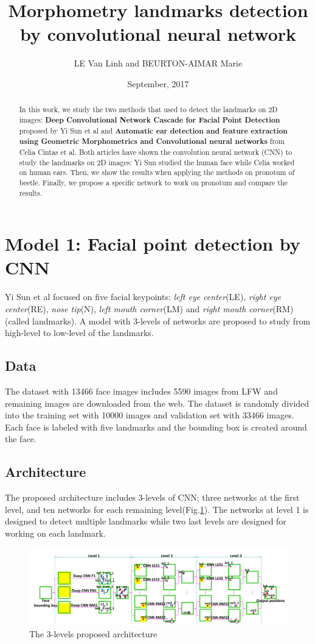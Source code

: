 \documentclass[12pt,a4paper]{article}
\begin{document}
\title{Morphometry landmarks detection by convolutional neural network}
\author{LE Van Linh and BEURTON-AIMAR Marie}
\date{September, 2017}
\maketitle
\begin{abstract}

	In this work, we study the two methods that used to detect the landmarks on 2D images: \textbf{Deep Convolutional Network Cascade for Facial Point Detection} proposed by Yi Sun et al\cite{sun2013deep} and \textbf{Automatic ear detection and feature extraction using Geometric Morphometrics and Convolutional neural networks} from Celia Cintas et al\cite{cintas2016automatic}. Both articles have shown the convolution neural network (CNN) to study the landmarks on 2D images: Yi Sun studied the human face while Celia worked on human ears. Then, we show the results when applying the methods on pronotum of beetle. Finally, we propose a specific network to work on pronotum and compare the results.
\end{abstract}
\section{Model 1: Facial point detection by CNN}
Yi Sun et al\cite{sun2013deep} focused on five facial keypoints: \textit{left eye center}(LE), \textit{right eye center}(RE), \textit{nose tip}(N), \textit{left mouth corner}(LM) and \textit{right mouth corner}(RM) (called landmarks). A model with 3-levels of networks are proposed to study from high-level to low-level of the landmarks.
\subsection{Data}
The dataset with 13466 face images includes 5590 images from LFW \cite{huang2007labeled} and remaining images are downloaded from the web. The dataset is randomly divided into the training set with 10000 images and validation set with 33466 images. Each face is labeled with five landmarks and the bounding box is created around the face.
\subsection{Architecture}
The proposed architecture includes 3-levels of CNN: three networks at the first level, and ten networks for each remaining level(Fig.\ref{3levels}). The networks at level 1 is designed to detect multiple landmarks while two last levels are designed for working on each landmark.
\begin{figure}[h]
	\centering
	\includegraphics[scale=0.35]{images/3levels}
	\caption{The 3-levels proposed architecture}
	\label{3levels}
\end{figure}
\end{document}
